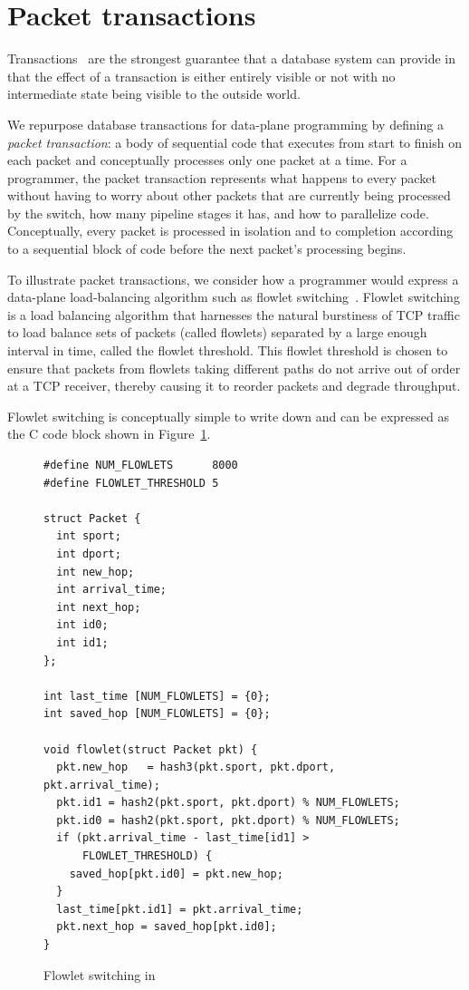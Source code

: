 \section{Packet transactions}
\label{s:transactions}
Transactions~\cite{db_trans} are the strongest guarantee that a database system
can provide in that the effect of a transaction is either entirely visible or
not with no intermediate state being visible to the outside world.

We repurpose database transactions for data-plane programming by defining a
\textit{packet transaction}: a body of sequential code that executes from start
to finish on each packet and conceptually processes only one packet at a time.
For a programmer, the packet transaction represents what happens to every
packet without having to worry about other packets that are currently being
processed by the switch, how many pipeline stages it has, and how to
parallelize code. Conceptually, every packet is processed in isolation and to
completion according to a sequential block of code before the next packet's
processing begins.

To illustrate packet transactions, we consider how a programmer would express a
data-plane load-balancing algorithm such as flowlet switching~\cite{flowlet}.
Flowlet switching is a load balancing algorithm that harnesses the natural
burstiness of TCP traffic to load balance sets of packets (called flowlets)
separated by a large enough interval in time, called the flowlet threshold.
This flowlet threshold is chosen to ensure that packets from flowlets taking
different paths do not arrive out of order at a TCP receiver, thereby causing
it to reorder packets and degrade throughput.

Flowlet switching is conceptually simple to write down and can be expressed as
the C code block shown in Figure~\ref{fig:flowlet}.
\begin{figure}[!h]
\begin{tiny}
\begin{lstlisting}
#define NUM_FLOWLETS      8000
#define FLOWLET_THRESHOLD 5

struct Packet {
  int sport;
  int dport;
  int new_hop;
  int arrival_time;
  int next_hop;
  int id0;
  int id1;
};

int last_time [NUM_FLOWLETS] = {0};
int saved_hop [NUM_FLOWLETS] = {0};

void flowlet(struct Packet pkt) {
  pkt.new_hop   = hash3(pkt.sport, pkt.dport, pkt.arrival_time);
  pkt.id1 = hash2(pkt.sport, pkt.dport) % NUM_FLOWLETS;
  pkt.id0 = hash2(pkt.sport, pkt.dport) % NUM_FLOWLETS;
  if (pkt.arrival_time - last_time[id1] >
      FLOWLET_THRESHOLD) {
    saved_hop[pkt.id0] = pkt.new_hop;
  }
  last_time[pkt.id1] = pkt.arrival_time;
  pkt.next_hop = saved_hop[pkt.id0];
}
\end{lstlisting}
\end{tiny}
\caption{Flowlet switching in \pktlanguage}
\label{fig:flowlet}
\end{figure}

